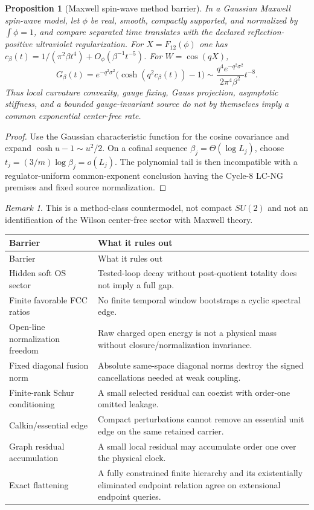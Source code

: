 \documentclass[11pt,oneside]{report}
\newtheorem{proposition}[theorem]{Proposition}
\theoremstyle{definition}
\theoremstyle{remark}
\newtheorem{remark}[theorem]{Remark}
\begin{document}
\begin{proposition}[Maxwell spin-wave method barrier]
In a Gaussian Maxwell spin-wave model, let $\phi$ be real, smooth, compactly
supported, and normalized by $\int\phi=1$, and compare separated time
translates with the declared reflection-positive ultraviolet regularization.
For $X=F_{12}(\phi)$ one has
$c_\beta(t)=1/(\pi^2\beta t^4)+O_\phi(\beta^{-1}t^{-5})$. For
$W=\cos(qX)$,
\[
 G_\beta(t)=e^{-q^2\sigma^2}\bigl(\cosh(q^2c_\beta(t))-1\bigr)
 \sim\frac{q^4e^{-q^2\sigma^2}}{2\pi^4\beta^2}t^{-8}.
\]
Thus local curvature convexity, gauge fixing, Gauss projection, asymptotic
stiffness, and a bounded gauge-invariant source do not by themselves imply a
common exponential center-free rate.
\end{proposition}
\begin{proof}
Use the Gaussian characteristic function for the cosine covariance and expand
$\cosh u-1\sim u^2/2$. On a cofinal sequence
$\beta_j=\Theta(\log L_j)$, choose
$t_j=(3/m)\log\beta_j=o(L_j)$. The polynomial tail is then incompatible with
a regulator-uniform common-exponent conclusion having the Cycle-8 LC-NG
premises and fixed source normalization.
\end{proof}
\begin{remark}
This is a method-class countermodel, not compact $SU(2)$ and not an
identification of the Wilson center-free sector with Maxwell theory.
\end{remark}

\begin{longtable}{p{}p{}}
\toprule Barrier & What it rules out \\
\midrule\endfirsthead\toprule Barrier & What it rules out \\
\midrule\endhead
Hidden soft OS sector & Tested-loop decay without post-quotient totality does not imply a full gap. \\
Finite favorable FCC ratios & No finite temporal window bootstraps a cyclic spectral edge. \\
Open-line normalization freedom & Raw charged open energy is not a physical mass without closure/normalization invariance. \\
Fixed diagonal fusion norm & Absolute same-space diagonal norms destroy the signed cancellations needed at weak coupling. \\
Finite-rank Schur conditioning & A small selected residual can coexist with order-one omitted leakage. \\
Calkin/essential edge & Compact perturbations cannot remove an essential unit edge on the same retained carrier. \\
Graph residual accumulation & A small local residual may accumulate order one over the physical clock. \\
Exact flattening & A fully constrained finite hierarchy and its existentially eliminated endpoint relation agree on extensional endpoint queries. \\
\bottomrule
\end{longtable}
\end{document}
